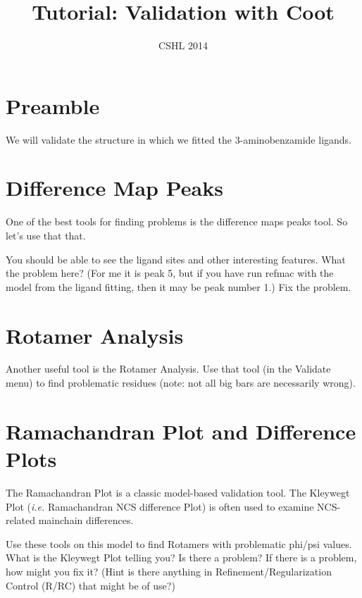 \documentclass{article}
\title{Tutorial: Validation with Coot}
\author{CSHL 2014}
\begin{document}
\maketitle

\section{Preamble}

  We will validate the structure in which we fitted the
  3-aminobenzamide ligands.

\section{Difference Map Peaks}

  One of the best tools for finding problems is the difference maps
  peaks tool. So let's use that that.  

  You should be able to see the ligand sites and other interesting
  features. What the problem here? (For me it is peak 5, but if you
  have run refmac with the model from the ligand fitting, then it may
  be peak number 1.)  Fix the problem.

\section{Rotamer Analysis}
 
Another useful tool is the Rotamer Analysis.  Use that tool (in the
\textsf{Validate} menu) to find problematic residues (note: not all
big bars are necessarily wrong).





\section{Ramachandran Plot and Difference Plots}

The Ramachandran Plot is a classic model-based validation tool.  The
Kleywegt Plot (\emph{i.e.} Ramachandran NCS difference Plot) is often
used to examine NCS-related mainchain differences.

Use these tools on this model to find Rotamers with problematic
phi/psi values.  What is the Kleywegt Plot telling you? Is there a
problem? If there is a problem, how might you fix it? (Hint is there
anything in Refinement/Regularization Control (R/RC) that might be of
use?)
\end{document}
